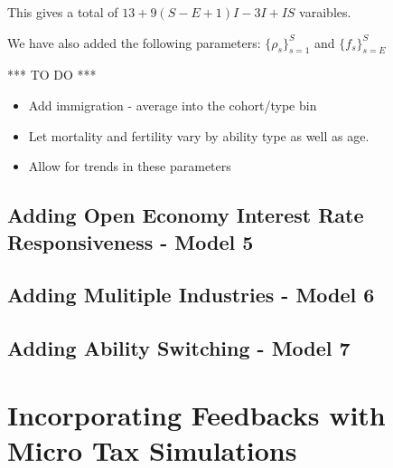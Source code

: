 \documentclass[letterpaper,12pt]{article}
\theoremstyle{definition}
\numberwithin{equation}{section}
\begin{document}
\begin{spacing}{1.5}
    This gives a total of $13 + 9(S-E+1)I - 3I + IS$ varaibles.

    We have also added the following parameters: $\{\rho_s\}_{s=1}^S$ and $\{f_s\}_{s=E}^S$

    *** TO DO ***
    \begin{itemize}
    \item Add immigration - average into the cohort/type bin
    \item Let mortality and fertility vary by ability type as well as age.
    \item Allow for trends in these parameters
    \end{itemize}

  \newpage


  \subsection{Adding Open Economy Interest Rate Responsiveness - Model 5}\label{SubSec_Macro_Open}

  \subsection{Adding Mulitiple Industries - Model 6}\label{SubSec_Macro_Multi}

  \subsection{Adding Ability Switching - Model 7}\label{SubSec_Macro_Switch}

\newpage

\section{Incorporating Feedbacks with Micro Tax Simulations}\label{SecMicro}


\end{spacing}
\end{document}
